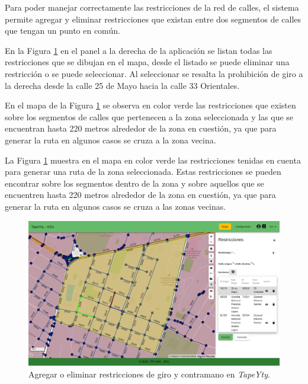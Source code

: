 Para poder manejar correctamente las restricciones de la red de calles, el sistema permite agregar y eliminar restricciones que existan entre dos segmentos de calles que tengan un punto en común. 

En la Figura \ref{fig:restriccion} en el panel a la derecha de la aplicación se listan todas las restricciones que se dibujan en el mapa, desde el listado se puede eliminar una restricción o se puede seleccionar. Al seleccionar se resalta la prohibición de giro a la derecha desde la calle 25 de Mayo hacia la calle 33 Orientales.

En el mapa de la Figura \ref{fig:restriccion} se observa en color verde las restricciones que existen sobre los segmentos de calles que pertenecen a la zona seleccionada y las que se encuentran hasta 220 metros alrededor de la zona en cuestión, ya que para generar la ruta en algunos casos se cruza a la zona vecina.

La Figura \ref{fig:restriccion} muestra en el mapa en color verde las restricciones tenidas en cuenta para generar una ruta de la zona seleccionada. Estas restricciones se pueden encontrar sobre los segmentos dentro de la zona y sobre aquellos que se encuentren hasta 220 metros alrededor de la zona en cuestión, ya que para generar la ruta en algunos casos se cruza a las zonas vecinas.


\begin{figure}[H]
\centerline{\includegraphics[width=\textwidth]{restricciones.png}}
\caption{Agregar o eliminar restricciones de giro y contramano en \textit{TapeYty}.}
\label{fig:restriccion}
\end{figure}

